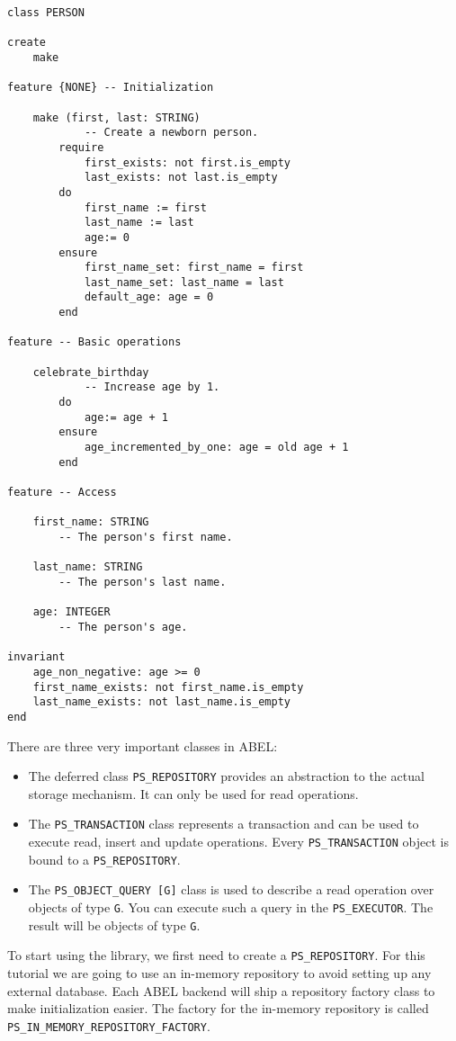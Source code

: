 \documentclass[a4paper,12pt]{report}
\begin{document}
\begin{lstlisting}[language=OOSC2Eiffel, captionpos=b, caption={The PERSON class}, label={lst:person_class}]
class PERSON

create
	make

feature {NONE} -- Initialization

	make (first, last: STRING)
			-- Create a newborn person.
		require
			first_exists: not first.is_empty
			last_exists: not last.is_empty
		do
			first_name := first
			last_name := last
			age:= 0
		ensure
			first_name_set: first_name = first
			last_name_set: last_name = last
			default_age: age = 0
		end

feature -- Basic operations

	celebrate_birthday
			-- Increase age by 1.
		do
			age:= age + 1
		ensure
			age_incremented_by_one: age = old age + 1
		end

feature -- Access

	first_name: STRING
		-- The person's first name.

	last_name: STRING
		-- The person's last name.

	age: INTEGER
		-- The person's age.

invariant
	age_non_negative: age >= 0
	first_name_exists: not first_name.is_empty
	last_name_exists: not last_name.is_empty
end

\end{lstlisting}

There are three very important classes in ABEL:
\begin{itemize}
 \item The deferred class \lstinline!PS_REPOSITORY! provides an abstraction to the actual storage mechanism. It can only be used for read operations.
 \item The \lstinline!PS_TRANSACTION! class represents a transaction and can be used to execute read, insert and update operations. Every \lstinline!PS_TRANSACTION! object is bound to a \lstinline!PS_REPOSITORY!.

 \item The \lstinline!PS_OBJECT_QUERY [G]! class is used to describe a read operation over objects of type \lstinline!G!. You can execute such a query in the \lstinline!PS_EXECUTOR!. 
	The result will be objects of type \lstinline!G!.

 
\end{itemize}
To start using the library, we first need to create a \lstinline!PS_REPOSITORY!.
For this tutorial we are going to use an in-memory repository to avoid setting up any external database.
Each ABEL backend will ship a repository factory class to make initialization easier.
The factory for the in-memory repository is called \lstinline!PS_IN_MEMORY_REPOSITORY_FACTORY!.
\end{document}
